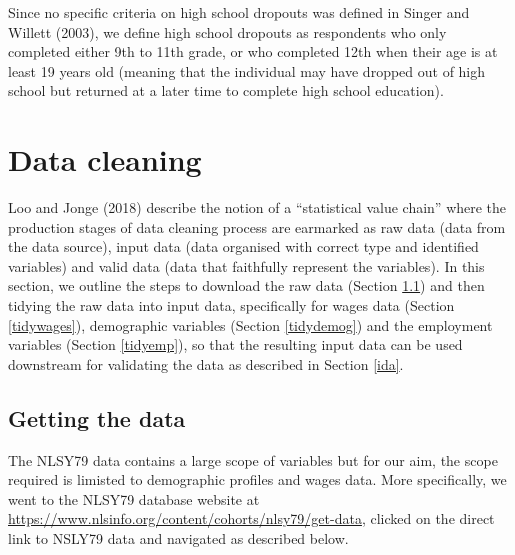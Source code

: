 \documentclass{article}
\begin{document}
Since no specific criteria on high school dropouts was defined
in Singer and Willett (2003), we define high school dropouts as respondents who only completed either 9th to 11th grade, or who completed 12th when their age is at least 19 years old (meaning that the individual may have dropped out of high school but returned at a later time to complete high school education).

\hypertarget{cleaning}{%
\section{Data cleaning}\label{cleaning}}

Loo and Jonge (2018) describe the notion of a ``statistical value chain'' where the production stages of data cleaning process are earmarked as raw data (data from the data source), input data (data organised with correct type and identified variables) and valid data (data that faithfully represent the variables). In this section, we outline the steps to download the raw data (Section \ref{getdata}) and then tidying the raw data into input data, specifically for wages data (Section \ref{tidywages}), demographic variables (Section \ref{tidydemog}) and the employment variables (Section \ref{tidyemp}), so that the resulting input data can be used downstream for validating the data as described in Section \ref{ida}.

\hypertarget{getdata}{%
\subsection{Getting the data}\label{getdata}}

The NLSY79 data contains a large scope of variables but for our aim, the scope required is limisted to demographic profiles and wages data. More specifically, we went to the NLSY79 database website at \url{https://www.nlsinfo.org/content/cohorts/nlsy79/get-data}, clicked on the direct link to NSLY79 data and navigated as described below.
\end{document}
